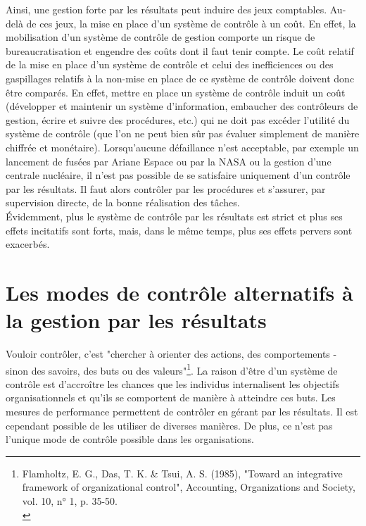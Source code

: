 \documentclass{kaobook}
\begin{document}
Ainsi, une gestion forte par les résultats peut induire des jeux comptables. Au-delà de ces jeux, la mise en place d’un système de contrôle à un coût. En effet, la mobilisation d’un système de contrôle de gestion comporte un risque de bureaucratisation et engendre des coûts dont il faut tenir compte. Le coût relatif de la mise en place d’un système de contrôle et celui des inefficiences ou des gaspillages relatifs à la non-mise en place de ce système de contrôle doivent donc être comparés. En effet, mettre en place un système de contrôle induit un coût (développer et maintenir un système d’information, embaucher des contrôleurs de gestion, écrire et suivre des procédures, etc.) qui ne doit pas excéder l’utilité du système de contrôle (que l’on ne peut bien sûr pas évaluer simplement de manière chiffrée et monétaire). Lorsqu’aucune défaillance n’est acceptable, par exemple un lancement de fusées par Ariane Espace ou par la NASA ou la gestion d’une centrale nucléaire, il n’est pas possible de se satisfaire uniquement d’un contrôle par les résultats. Il faut alors contrôler par les procédures et s’assurer, par supervision directe, de la bonne réalisation des tâches.\\

Évidemment, plus le système de contrôle par les résultats est strict et plus ses effets incitatifs sont forts, mais, dans le même temps, plus ses effets pervers sont exacerbés.\\

\section{Les modes de contrôle alternatifs à la gestion par les résultats}
\label{sec:org5bf27a1}
Vouloir contrôler, c'est "chercher à orienter des actions, des comportements - sinon des savoirs, des buts ou des valeurs"\footnote{Flamholtz, E. G., Das, T. K. \& Tsui, A. S. (1985), "Toward an integrative framework of organizational control", Accounting, Organizations and Society, vol. 10, n° 1, p. 35-50.\\}. La raison d'être d'un système de contrôle est d'accroître les chances que les individus internalisent les objectifs organisationnels et qu'ils se comportent de manière à atteindre ces buts. Les mesures de performance permettent de contrôler en gérant par les résultats. Il est cependant possible de les utiliser de diverses manières. De plus, ce n'est pas l'unique mode de contrôle possible dans les organisations.\\
\end{document}

